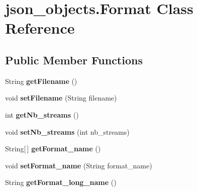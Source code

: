 \hypertarget{classjson__objects_1_1_format}{
\section{json\_\-objects.Format Class Reference}
\label{classjson__objects_1_1_format}
}
\subsection*{Public Member Functions}
\begin{DoxyCompactItemize}
\item 
\hypertarget{classjson__objects_1_1_format_ad00dd29fb2392c18df2317a93c0a4a09}{
String {\bfseries getFilename} ()}
\label{classjson__objects_1_1_format_ad00dd29fb2392c18df2317a93c0a4a09}

\item 
\hypertarget{classjson__objects_1_1_format_a2267249e9b6cdc84d043c0e17741950d}{
void {\bfseries setFilename} (String filename)}
\label{classjson__objects_1_1_format_a2267249e9b6cdc84d043c0e17741950d}

\item 
\hypertarget{classjson__objects_1_1_format_aa0f63ea29d380f085bedb6e15d426cbe}{
int {\bfseries getNb\_\-streams} ()}
\label{classjson__objects_1_1_format_aa0f63ea29d380f085bedb6e15d426cbe}

\item 
\hypertarget{classjson__objects_1_1_format_a5c2feb7dab6599c1572c69ba5045ba6e}{
void {\bfseries setNb\_\-streams} (int nb\_\-streams)}
\label{classjson__objects_1_1_format_a5c2feb7dab6599c1572c69ba5045ba6e}

\item 
\hypertarget{classjson__objects_1_1_format_ac7cdbda0a2373e0f9297f09de168ca01}{
String\mbox{[}$\,$\mbox{]} {\bfseries getFormat\_\-name} ()}
\label{classjson__objects_1_1_format_ac7cdbda0a2373e0f9297f09de168ca01}

\item 
\hypertarget{classjson__objects_1_1_format_affa3512fda35dffaa2814f540d685c19}{
void {\bfseries setFormat\_\-name} (String format\_\-name)}
\label{classjson__objects_1_1_format_affa3512fda35dffaa2814f540d685c19}

\item 
\hypertarget{classjson__objects_1_1_format_a4444c72ae9003eb812179ef95bffecb6}{
String {\bfseries getFormat\_\-long\_\-name} ()}
\label{classjson__objects_1_1_format_a4444c72ae9003eb812179ef95bffecb6}


\end{DoxyCompactItemize}

